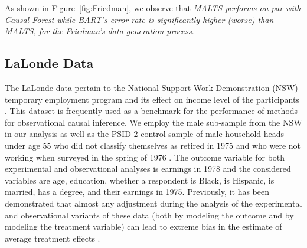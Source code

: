 As shown in Figure~\ref{fig:Friedman}, we observe that \textit{MALTS performs on par with Causal Forest while BART's error-rate is significantly higher (worse) than MALTS, for the Friedman's data generation process}. 




\subsection{LaLonde Data}
The LaLonde data pertain to the National Support Work Demonstration (NSW) temporary employment program and its effect on income level of the participants \citep{lalonde}. This dataset is frequently used as a benchmark for the performance of methods for observational causal inference. We employ the male sub-sample from the NSW in our analysis as well as the PSID-2 control sample of male household-heads under age 55 who did not classify themselves as retired in 1975 and who were not working when surveyed in the spring of 1976 \citep{dehejia_wahba_nonexp}. The outcome variable for both experimental and observational analyses is earnings in 1978 and the considered variables are age, education, whether a respondent is Black, is Hispanic, is married, has a degree, and their earnings in 1975. Previously, it has been demonstrated that almost any adjustment during the analysis of the experimental and observational variants of these data (both by modeling the outcome and by modeling the treatment variable) can lead to extreme bias in the estimate of average treatment effects \citep{lalonde}.

